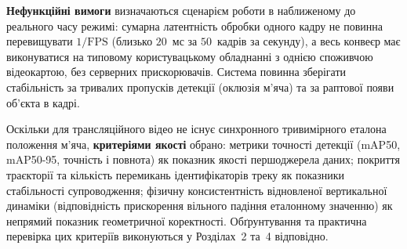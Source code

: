 \textbf{Нефункційні вимоги} визначаються сценарієм роботи в наближеному до реального
часу режимі: сумарна латентність обробки одного кадру не повинна перевищувати $1/\text{FPS}$
(близько $20$~мс за $50$~кадрів за секунду), а весь конвеєр має виконуватися на типовому
користувацькому обладнанні з однією споживчою відеокартою, без серверних прискорювачів.
Система повинна зберігати стабільність за тривалих пропусків детекції (оклюзія м'яча) та
за раптової появи об'єкта в кадрі.

Оскільки для трансляційного відео не існує синхронного тривимірного еталона положення
м'яча, \textbf{критеріями якості} обрано: метрики точності детекції (mAP50, mAP50-95,
точність і повнота) як показник якості першоджерела даних; покриття траєкторії та
кількість перемикань ідентифікаторів треку як показники стабільності супроводження;
фізичну консистентність відновленої вертикальної динаміки (відповідність прискорення
вільного падіння еталонному значенню) як непрямий показник геометричної коректності.
Обґрунтування та практична перевірка цих критеріїв виконуються у Розділах~2 та~4 відповідно.


